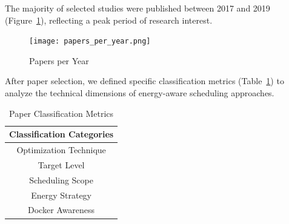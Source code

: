 \documentclass[runningheads]{llncs}
\begin{document}
The majority of selected studies were published between 2017 and 2019 (Figure~\ref{fig:papers_per_year}), reflecting a peak period of research interest.

\begin{figure}[H]
    \centering
    \texttt{[image: papers\_per\_year.png]}
    \caption{Papers per Year}\label{fig:papers_per_year}
\end{figure}

After paper selection, we defined specific classification metrics (Table~\ref{tab:Paper Classification}) to analyze the technical dimensions of energy-aware scheduling approaches.

\begin{table}[H]
\centering
\begin{tabular}{c}
\hline
Classification Categories\\ \hline
Optimization Technique \\ 
Target Level  \\ 
Scheduling Scope \\ 
Energy Strategy \\
Docker Awareness \\
\hline
\end{tabular}
    \caption{Paper Classification Metrics}
    \label{tab:Paper Classification}
\end{table}
\end{document}
